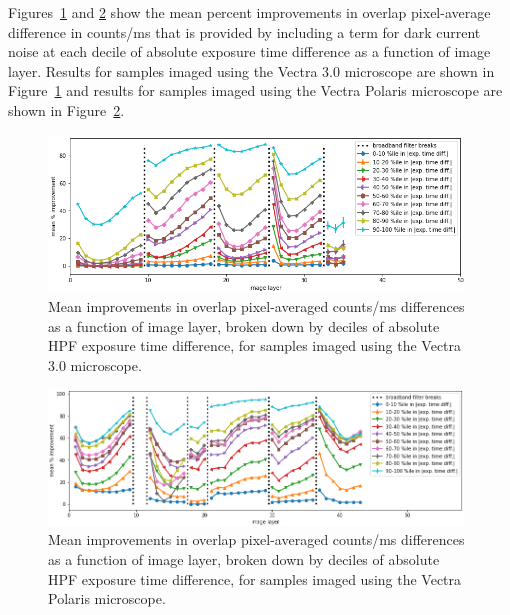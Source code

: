 \documentclass[letterpaper,11pt]{article}
\newcommand{\reffig}[1]{Figure~\ref{#1}}
\begin{document}
Figures~\ref{fig:mean_improvements_by_layer_vectra} and \ref{fig:mean_improvements_by_layer_polaris} show the mean percent improvements in overlap pixel-average difference in counts/ms that is provided by including a term for dark current noise at each decile of absolute exposure time difference as a function of image layer. Results for samples imaged using the Vectra 3.0 microscope are shown in \reffig{fig:mean_improvements_by_layer_vectra} and results for samples imaged using the Vectra Polaris microscope are shown in \reffig{fig:mean_improvements_by_layer_polaris}. 

\begin{figure}[!ht]
\centering
\includegraphics[width=0.98\textwidth]{images/results/avg_improvements_by_layer_vectra}
\caption{\footnotesize Mean improvements in overlap pixel-averaged counts/ms differences as a function of image layer, broken down by deciles of absolute HPF exposure time difference, for samples imaged using the Vectra 3.0 microscope.}
\label{fig:mean_improvements_by_layer_vectra}
\end{figure}

\begin{figure}[!ht]
\centering
\includegraphics[width=0.98\textwidth]{images/results/avg_improvements_by_layer_polaris}
\caption{\footnotesize Mean improvements in overlap pixel-averaged counts/ms differences as a function of image layer, broken down by deciles of absolute HPF exposure time difference, for samples imaged using the Vectra Polaris microscope.}
\label{fig:mean_improvements_by_layer_polaris}
\end{figure}
\end{document}
